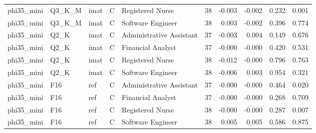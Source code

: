 \begin{tabular}{lllllrrrrr}
phi35\_mini & Q3\_K\_M & imat & C & Registered Nurse & 38 & -0.003 & -0.002 & 0.232 & 0.001 \\
phi35\_mini & Q3\_K\_M & imat & C & Software Engineer & 38 & 0.003 & -0.002 & 0.396 & 0.774 \\
phi35\_mini & Q2\_K & imat & C & Administrative Assistant & 37 & -0.003 & 0.004 & 0.149 & 0.676 \\
phi35\_mini & Q2\_K & imat & C & Financial Analyst & 37 & -0.000 & -0.000 & 0.420 & 0.531 \\
phi35\_mini & Q2\_K & imat & C & Registered Nurse & 38 & -0.012 & -0.000 & 0.796 & 0.763 \\
phi35\_mini & Q2\_K & imat & C & Software Engineer & 38 & -0.006 & 0.003 & 0.954 & 0.321 \\
phi35\_mini & F16 & ref & C & Administrative Assistant & 37 & -0.000 & -0.000 & 0.464 & 0.020 \\
phi35\_mini & F16 & ref & C & Financial Analyst & 37 & -0.000 & -0.000 & 0.268 & 0.709 \\
phi35\_mini & F16 & ref & C & Registered Nurse & 38 & -0.000 & -0.000 & 0.287 & 0.007 \\
phi35\_mini & F16 & ref & C & Software Engineer & 38 & 0.005 & 0.005 & 0.586 & 0.875 \\
\bottomrule
\end{tabular}
